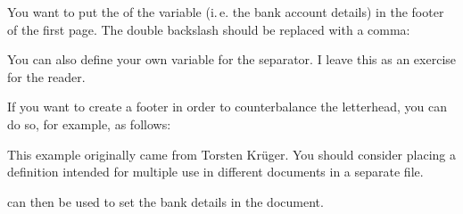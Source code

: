 %
\begin{Example}
  You want to put the  of the  variable
  (i.\,e. the bank account details) in the footer of the first page. The
  double backslash should be replaced with a comma:
\begin{lstcode}
\end{lstcode}
  You can also define your own variable for the separator. I leave
  this as an exercise for the reader.

  If you want to create a footer in order to counterbalance the letterhead, you
  can do so, for example, as follows:
\begin{lstcode}
\end{lstcode}
  This example originally came from Torsten Kr\"uger. You should
  consider placing a definition intended for multiple use in different
  documents in a separate  file.
\begin{lstcode}
\end{lstcode}
  can then be used to set the bank details in the document.
\end{Example}

